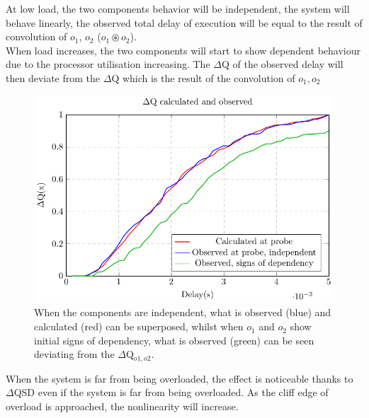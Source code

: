         At low load, the two components behavior will be independent, the system will behave linearly, the observed total delay of execution will be equal to the result of convolution of $o_1$, $o_2$ ($o_1 \circledast o_2$). \\
        
        When load increases, the two components will start to show dependent behaviour due to the processor utilisation increasing. The $\Delta$Q of the observed delay will then deviate from the $\Delta$Q which is the result of the convolution of $o_1, o_2$
        \begin{figure}[H]
            \begin{center}
                \includegraphics[scale=1]{tikz/cdf_indep.pdf}
            \end{center}
            \caption{When the components are independent, what is observed (blue) and calculated (red) can be superposed, whilst when $o_1$ and $o_2$ show initial signs of dependency, what is observed (green) can be seen deviating from the $\Delta$Q$_{o1, o2}$.}
            \label{fig:cdf_indep}
        \end{figure}

        When the system is far from being overloaded, the effect is noticeable thanks to $\Delta$QSD even if the system is far from being overloaded. As the cliff edge of overload is approached, the nonlinearity will increase.
